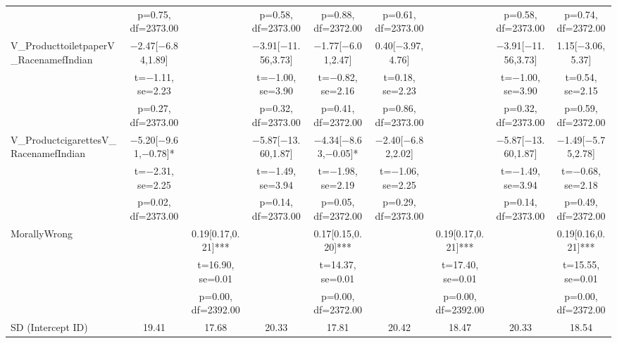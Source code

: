 \documentclass[]{report}
\begin{document}
\begin{table}
{\begin{tabular}[t]{lcccccccc}
		& p=\num{0.75}, df=\num{2373.00} &  & p=\num{0.58}, df=\num{2373.00} & p=\num{0.88}, df=\num{2372.00} & p=\num{0.61}, df=\num{2373.00} &  & p=\num{0.58}, df=\num{2373.00} & p=\num{0.74}, df=\num{2372.00}\\
		V\_ProducttoiletpaperV\_RacenamefIndian & \num{-2.47}[\num{-6.84},\num{1.89}] &  & \num{-3.91}[\num{-11.56},\num{3.73}] & \num{-1.77}[\num{-6.01},\num{2.47}] & \num{0.40}[\num{-3.97},\num{4.76}] &  & \num{-3.91}[\num{-11.56},\num{3.73}] & \num{1.15}[\num{-3.06},\num{5.37}]\\
		& t=\num{-1.11}, se=\num{2.23} &  & t=\num{-1.00}, se=\num{3.90} & t=\num{-0.82}, se=\num{2.16} & t=\num{0.18}, se=\num{2.23} &  & t=\num{-1.00}, se=\num{3.90} & t=\num{0.54}, se=\num{2.15}\\
		& p=\num{0.27}, df=\num{2373.00} &  & p=\num{0.32}, df=\num{2373.00} & p=\num{0.41}, df=\num{2372.00} & p=\num{0.86}, df=\num{2373.00} &  & p=\num{0.32}, df=\num{2373.00} & p=\num{0.59}, df=\num{2372.00}\\
		V\_ProductcigarettesV\_RacenamefIndian & \num{-5.20}[\num{-9.61},\num{-0.78}]* &  & \num{-5.87}[\num{-13.60},\num{1.87}] & \num{-4.34}[\num{-8.63},\num{-0.05}]* & \num{-2.40}[\num{-6.82},\num{2.02}] &  & \num{-5.87}[\num{-13.60},\num{1.87}] & \num{-1.49}[\num{-5.75},\num{2.78}]\\
		& t=\num{-2.31}, se=\num{2.25} &  & t=\num{-1.49}, se=\num{3.94} & t=\num{-1.98}, se=\num{2.19} & t=\num{-1.06}, se=\num{2.25} &  & t=\num{-1.49}, se=\num{3.94} & t=\num{-0.68}, se=\num{2.18}\\
		& p=\num{0.02}, df=\num{2373.00} &  & p=\num{0.14}, df=\num{2373.00} & p=\num{0.05}, df=\num{2372.00} & p=\num{0.29}, df=\num{2373.00} &  & p=\num{0.14}, df=\num{2373.00} & p=\num{0.49}, df=\num{2372.00}\\
		MorallyWrong &  & \num{0.19}[\num{0.17},\num{0.21}]*** &  & \num{0.17}[\num{0.15},\num{0.20}]*** &  & \num{0.19}[\num{0.17},\num{0.21}]*** &  & \num{0.19}[\num{0.16},\num{0.21}]***\\
		&  & t=\num{16.90}, se=\num{0.01} &  & t=\num{14.37}, se=\num{0.01} &  & t=\num{17.40}, se=\num{0.01} &  & t=\num{15.55}, se=\num{0.01}\\
		&  & p=\num{0.00}, df=\num{2392.00} &  & p=\num{0.00}, df=\num{2372.00} &  & p=\num{0.00}, df=\num{2392.00} &  & p=\num{0.00}, df=\num{2372.00}\\
		SD (Intercept ID) & \num{19.41} & \num{17.68} & \num{20.33} & \num{17.81} & \num{20.42} & \num{18.47} & \num{20.33} & \num{18.54}\\

\end{tabular}}
\end{table}
\end{document}
